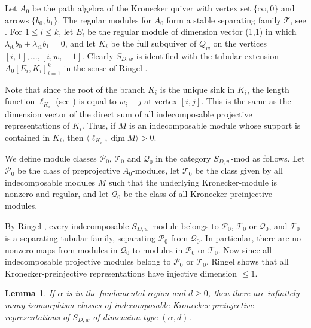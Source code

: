 \documentclass{amsart}
\theoremstyle{plain}
\newtheorem{lem}[thm]{Lemma}
\theoremstyle{definition}
\theoremstyle{remark}
\begin{document}
Let $A_0$ be the path algebra of the Kronecker quiver with
vertex set $\{\infty,0\}$ and arrows $\{b_0,b_1\}$.
The regular modules for $A_0$ form a stable separating family $\mathcal{T}$,
see \cite[\S 3.2]{Ringel}.
For $1\le i\le k$, let $E_i$ be the regular module of dimension vector (1,1) in which
$\lambda_{i0} b_0 + \lambda_{i1} b_1 = 0$, and let $K_i$ be the full subquiver
of $Q_w$ on the vertices $[i,1],\dots,[i,w_i-1]$. Clearly
$S_{D,w}$ is identified with the tubular extension $A_0[E_i,K_i]_{i=1}^k$ in the sense
of Ringel \cite[\S 4.7]{Ringel}.

Note that since the root of the branch $K_i$ is the unique sink in $K_i$, the length
function $\ell_{K_i}$ (see \cite[\S 4.4]{Ringel}) is equal to $w_i - j$ at vertex $[i,j]$.
This is the same as the dimension vector of the direct sum of all indecomposable
projective representations of $K_i$. Thus, if $M$ is an indecomposable module whose support
is contained in $K_i$, then $\langle \ell_{K_i},\underline{\dim} M\rangle > 0$.


We define module classes $\mathcal{P}_0$, $\mathcal{T}_0$ and $\mathcal{Q}_0$ in
the category $S_{D,w}$-mod as follows.
Let $\mathcal{P}_0$ be the class of preprojective $A_0$-modules,
let $\mathcal{T}_0$ be the class given by all indecomposable modules $M$ such that the underlying Kronecker-module is nonzero
and regular, and let $\mathcal{Q}_0$ be the class of all Kronecker-preinjective modules.

By Ringel \cite[Theorem 4.7(1)]{Ringel}, every indecomposable $S_{D,w}$-module
belongs to $\mathcal{P}_0$, $\mathcal{T}_0$ or $\mathcal{Q}_0$, and
$\mathcal{T}_0$ is a separating tubular family, separating $\mathcal{P}_0$ from $\mathcal{Q}_0$.
In particular, there are no nonzero maps from modules in $\mathcal{Q}_0$ to modules
in $\mathcal{P}_0$ or $\mathcal{T}_0$. Now since all indecomposable
projective modules belong to $\mathcal{P}_0$ or $\mathcal{T}_0$,
Ringel \cite[2.4(1*)]{Ringel} shows that all Kronecker-preinjective
representations have injective dimension $\le 1$.


\begin{lem}\label{l:frinf}
If $\alpha$ is in the fundamental region and $d\ge 0$, then there are infinitely many
isomorphism classes of indecomposable Kronecker-preinjective representations of $S_{D,w}$ of
dimension type $(\alpha,d)$.
\end{lem}
\end{document}
